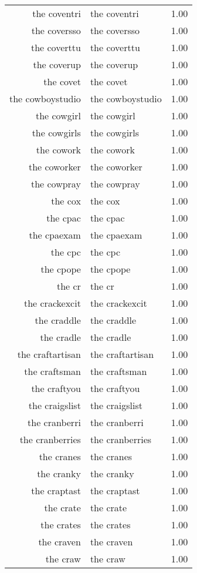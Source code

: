 \begin{table}[ht]
\begin{tabular}{rlr}
  the coventri & the coventri & 1.00 \\ 
  the coversso & the coversso & 1.00 \\ 
  the coverttu & the coverttu & 1.00 \\ 
  the coverup & the coverup & 1.00 \\ 
  the covet & the covet & 1.00 \\ 
  the cowboystudio & the cowboystudio & 1.00 \\ 
  the cowgirl & the cowgirl & 1.00 \\ 
  the cowgirls & the cowgirls & 1.00 \\ 
  the cowork & the cowork & 1.00 \\ 
  the coworker & the coworker & 1.00 \\ 
  the cowpray & the cowpray & 1.00 \\ 
  the cox & the cox & 1.00 \\ 
  the cpac & the cpac & 1.00 \\ 
  the cpaexam & the cpaexam & 1.00 \\ 
  the cpc & the cpc & 1.00 \\ 
  the cpope & the cpope & 1.00 \\ 
  the cr & the cr & 1.00 \\ 
  the crackexcit & the crackexcit & 1.00 \\ 
  the craddle & the craddle & 1.00 \\ 
  the cradle & the cradle & 1.00 \\ 
  the craftartisan & the craftartisan & 1.00 \\ 
  the craftsman & the craftsman & 1.00 \\ 
  the craftyou & the craftyou & 1.00 \\ 
  the craigslist & the craigslist & 1.00 \\ 
  the cranberri & the cranberri & 1.00 \\ 
  the cranberries & the cranberries & 1.00 \\ 
  the cranes & the cranes & 1.00 \\ 
  the cranky & the cranky & 1.00 \\ 
  the craptast & the craptast & 1.00 \\ 
  the crate & the crate & 1.00 \\ 
  the crates & the crates & 1.00 \\ 
  the craven & the craven & 1.00 \\ 
  the craw & the craw & 1.00 \\ 

\end{tabular}
\end{table}
